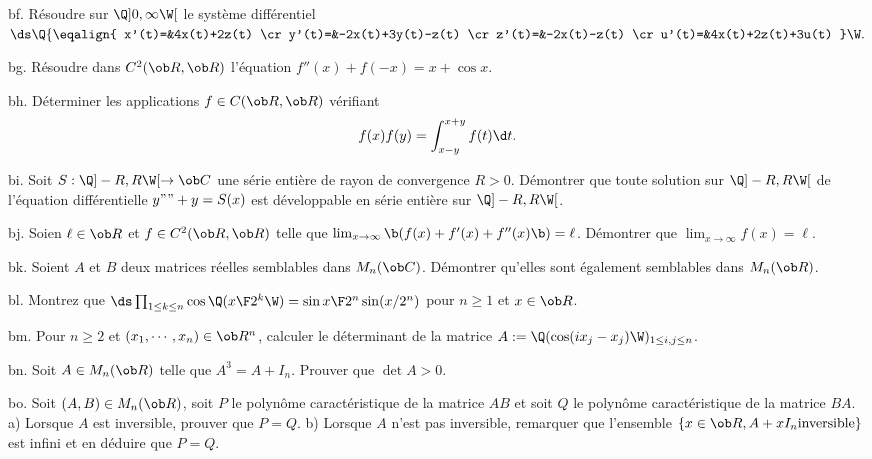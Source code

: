 \exo [Level=2,Fight=1,Learn=0,Field=\SystèmesDifférentiels,Type=\Exercices,Origin=] bf. 
Résoudre sur $\Q]0,\infty\W[$ le système différentiel 
$\ds
\Q\{\eqalign{
x'(t)=&4x(t)+2z(t)
\cr
y'(t)=&-2x(t)+3y(t)-z(t)
\cr
z'(t)=&-2x(t)-z(t)
\cr
u'(t)=&4x(t)+2z(t)+3u(t)
}\W.
$

\exo [Level=2,Fight=2,Learn=1,Field=\SystèmesDifférentiels,Type=\Exercices,Origin=] bg. 
Résoudre dans $\sc C^2(\ob R,\ob R)$ l'équation $f''(x)+f(-x)=x+\cos x$. 

\exo [Level=2,Fight=0,Learn=0,Field=\EquationsDifférentiellesLinéairesDuSecondOrdre|\Intégration,Type=\Colles,Origin=] bh. 
Déterminer les applications $f\in\sc C(\ob R,\ob R)$ vérifiant 
$$
f(x)f(y)=\int_{x-y}^{x+y}f(t)\d t. 
$$

\exo [Level=2,Fight=2,Learn=1,Field=\SériesEntières,Type=\Exercices,Origin=] bi. 
Soit $S:\Q]-R,R\W[\to\ob C$ une série entière 
de rayon de convergence $R>0$. Démontrer que toute solution 
sur $\Q]-R,R\W[$ de l'équation différentielle $y""+y=S(x)$ 
est développable en série entière sur $\Q]-R,R\W[$. 

\exo [Level=2,Fight=0,Learn=0,Field=\EquationsDifférentielles,Type=\Others,Origin=] bj. 
Soien $\ell\in\ob R$ et $f\in\sc C^2(\ob R,\ob R)$ 
telle que $\lim_{x\to\infty}\b(f(x)+f'(x)+f''(x)\b)=\ell$. \pn
Démontrer que $\lim_{x\to\infty}f(x)=\ell$. 

\exo [Level=1,Fight=2,Learn=1,Field=\Matrices,Type=\Exercices,Origin=\MP] bk. 
Soient $A$ et $B$ deux matrices réelles semblables dans $\sc M_n(\ob C)$. 
Démontrer qu'elles sont également semblables dans $\sc M_n(\ob R)$. 

\exo [Level=1,Fight=3,Learn=2,Type=\Colles,Field=\Trigonométrie|\Récurrences,Origin=] bl. 
Montrez que $\ds\prod_{1\le k\le n}\cos\Q({x\F2^k}\W)={\sin x\F 2^n\sin(x/2^n)}$ pour $n\ge1$ et $x\in\ob R$. 


\exo[Level=2,Fight=2,Learn=1,Field=\Déterminant,Type=\Colles,Origin=\MP]  bm. 
Pour $n\ge2$ et $(x_1,\cdots, x_n)\in\ob R^n$, 
calculer le déterminant de la matrice $A:=\Q(\cos(ix_j-x_j)\W)_{1\le i,j\le n}$.  
 
\exo [Level=2,Fight=3,Learn=1,Field=\Diagonalisation,Type=\Others,Origin=\MP] bn. 
Soit $A\in\sc M_n(\ob R)$ telle que $A^3=A+I_n$. Prouver que $\det A>0$. 

\exo [Level=2,Fight=2,Learn=2,Field=\PolynômesCaractéristiques,Type=\Exercices,Origin=\MP] bo. 
Soit $(A,B)\in \sc M_n(\ob R)$, soit $P$ 
le polynôme caractéristique de la matrice $AB$ 
et soit $Q$ le polynôme caractéristique de la matrice $BA$. \pn
a) Lorsque $A$ est inversible, prouver que $P=Q$. \pn
b) Lorsque $A$ n'est pas inversible, 
remarquer que l'ensemble $\{x\in\ob R,A+xI_n\rm{ inversible}\}$ est infini 
et en déduire que $P=Q$. 

